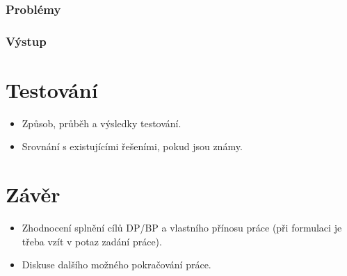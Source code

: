 \documentclass[11pt,twoside,a4paper]{book}
\begin{document}
\subsection{Problémy}

\subsection{Výstup}


\chapter{Testování}

\begin{itemize}
 \item Způsob, průběh a výsledky testování.
 \item Srovnání s existujícími řešeními, pokud jsou známy.
\end{itemize} 


\chapter{Závěr}

\begin{itemize}
\item Zhodnocení splnění cílů DP/BP a  vlastního přínosu práce (při formulaci je třeba vzít v potaz zadání práce).
\item Diskuse dalšího možného pokračování práce.
\end{itemize} 




%
%
%
%



\end{document}
